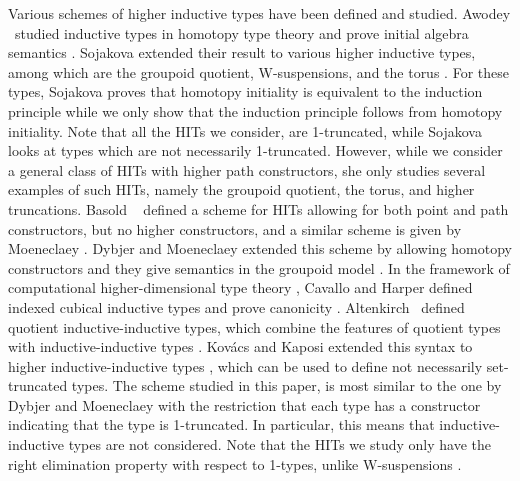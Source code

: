 Various schemes of higher inductive types have been defined and studied.
Awodey \etal \ studied inductive types in homotopy type theory and prove initial
algebra semantics \cite{AwodeyGS12}.
Sojakova extended their result to various higher inductive types, among which
are the groupoid quotient, W-suspensions, and the torus \cite{Sojakova15,sojakovaPhD}.
For these types, Sojakova proves that homotopy initiality is equivalent to the induction principle while we only show that the induction principle follows from homotopy initiality.
Note that all the HITs we consider, are 1-truncated, while Sojakova looks at types which are not necessarily 1-truncated.
However, while we consider a general class of HITs with higher path constructors, she only studies several examples of such HITs, namely the groupoid quotient, the torus, and higher truncations.
Basold \etal \ \cite{BasoldGW17} defined a scheme for HITs allowing for both point and path constructors,
but no higher constructors, and a similar scheme is given by
Moeneclaey \cite{moeneclaey2016schema}. 
Dybjer and Moeneclaey extended this scheme by allowing homotopy constructors and
they give semantics in the groupoid model \cite{DBLP:journals/entcs/DybjerM18}.
In the framework of computational higher-dimensional type theory \cite{AngiuliHW17},
Cavallo and Harper defined indexed cubical inductive types and prove canonicity \cite{CavalloH19}.
Altenkirch \etal \ defined quotient inductive-inductive types, which combine the features
of quotient types with inductive-inductive types \cite{forsberg2010inductive,AltenkirchCDKF18}.
Kov\'acs and Kaposi extended this syntax to higher inductive-inductive types \cite{KaposiK18},
which can be used to define not necessarily set-truncated types.
The scheme studied in this paper, is most similar to the one by Dybjer and Moeneclaey \cite{DBLP:journals/entcs/DybjerM18}
with the restriction that each type has a constructor indicating that the type is 1-truncated.
In particular, this means that inductive-inductive types are not considered.
Note that the HITs we study only have the right elimination property with respect to 1-types,
unlike W-suspensions \cite{Sojakova15,sojakovaPhD}.

